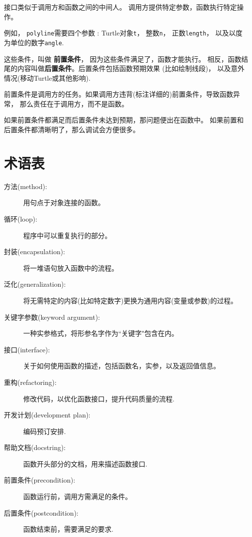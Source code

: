 \documentclass[10pt]{book}
\begin{document}
接口类似于调用方和函数之间的中间人。
调用方提供特定参数，函数执行特定操作。

例如， {\tt polyline}需要四个参数 : Turtle对象{\tt t}， 整数{\tt n}，
正数{\tt length}， 以及以度为单位的数字{\tt angle}.

这些条件，叫做 {\bf 前置条件}， 因为这些条件满足了，函数才能执行。
相反，函数结尾的内容叫做{\bf 后置条件}。后置条件包括函数预期效果
(比如绘制线段)， 以及意外情况(移动Turtle或其他影响).

前置条件是调用方的任务。如果调用方违背(标注详细的)前置条件，导致函数异常，
那么责任在于调用方，而不是函数。

如果前置条件都满足而后置条件未达到预期，那问题便出在函数中。
如果前置和后置条件都清晰明了，那么调试会方便很多。

\section{术语表}

\begin{description}

\item[方法(method):] 用句点于对象连接的函数。

\item[循环(loop):] 程序中可以重复执行的部分。

\item[封装(encapsulation):] 将一堆语句放入函数中的流程。

\item[泛化(generalization):] 将无需特定的内容(比如特定数字)更换为通用内容(变量或参数)的过程。

\item[关键字参数(keyword argument):] 一种实参格式，将形参名字作为``关键字"包含在内。

\item[接口(interface):] 关于如何使用函数的描述，包括函数名，实参，以及返回值信息。

\item[重构(refactoring):] 修改代码，以优化函数接口，提升代码质量的流程.

\item[开发计划(development plan):] 编码预订安排.

\item[帮助文档(docstring):] 函数开头部分的文档，用来描述函数接口. 

\item[前置条件(precondition):] 函数运行前，调用方需满足的条件。

\item[后置条件(postcondition):] 函数结束前，需要满足的要求.

\end{description}
\end{document}
